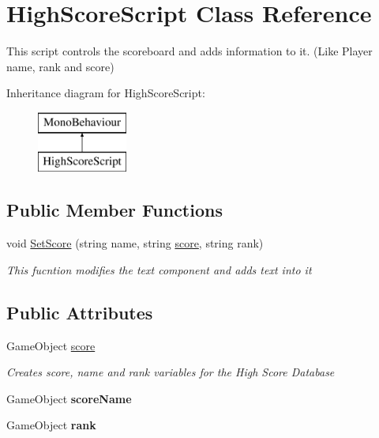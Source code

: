 \hypertarget{class_high_score_script}{}\section{High\+Score\+Script Class Reference}
\label{class_high_score_script}


This script controls the scoreboard and adds information to it. (Like Player name, rank and score)  


Inheritance diagram for High\+Score\+Script\+:\begin{figure}[H]
\begin{center}
\leavevmode
\includegraphics[height=2.000000cm]{class_high_score_script}
\end{center}
\end{figure}
\subsection*{Public Member Functions}
\begin{DoxyCompactItemize}
\item 
void \mbox{\hyperlink{class_high_score_script_ad9ef406b6e411f1a155be9cad38471be}{Set\+Score}} (string name, string \mbox{\hyperlink{class_high_score_script_acaef3205159e2e692bcb140618f2d84d}{score}}, string rank)
\begin{DoxyCompactList}\small\item\em This fucntion modifies the text component and adds text into it \end{DoxyCompactList}\end{DoxyCompactItemize}
\subsection*{Public Attributes}
\begin{DoxyCompactItemize}
\item 
Game\+Object \mbox{\hyperlink{class_high_score_script_acaef3205159e2e692bcb140618f2d84d}{score}}
\begin{DoxyCompactList}\small\item\em Creates score, name and rank variables for the High Score Database \end{DoxyCompactList}\item 
\mbox{\label{class_high_score_script_ab62d166f25519842ce8cf7f3f7dbb1ea}} 
Game\+Object {\bfseries score\+Name}
\item 
\mbox{\label{class_high_score_script_a94557499a852364672bda2aec16e2e54}} 
Game\+Object {\bfseries rank}
\end{DoxyCompactItemize}


